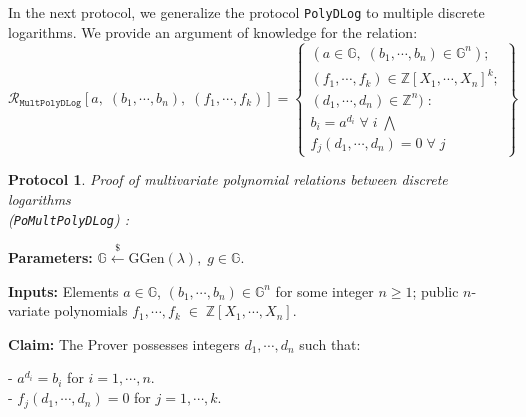 \documentclass[11pt, lettersize, notitlepage, leqno, footskip=0.6cm]{article}
\newcommand{\bz}{\mathbb Z}
\newcommand{\ttt}{\texttt}
\newcommand{\mc}{\mathcal}
\newcommand{\mb}{\mathbb}
\newcommand{\mr}{\mathrm}
\newcommand{\lamb}{\lambda}
\newtheorem{Prot}[Thm]{Protocol}
\numberwithin{equation}{section}
\begin{document}
In the next protocol, we generalize the protocol \verb|PolyDLog| to multiple discrete logarithms. We provide an argument of knowledge for the relation: 
\[
  \mc{R}_{\ttt{MultPolyDLog}}[a,\; (b_1,\cdots, b_n),\; (f_1,\cdots,f_k)] = \left\{\begin{array}{l}
    (a\in\mb{G},\; (b_1,\cdots, b_n)\in\mb{G}^n);\\
    (f_1,\cdots,f_k)\in\bz[X_1,\cdots,X_n]^k;\\ 
    (d_1,\cdots,d_n)\in\bz^n)\;: \\
    b_i = a^{d_i}\;\forall\; i\;\bigwedge \;\\   f_j(d_1,\cdots,d_n) = 0\;\forall\; j 
  \end{array}\right\}
\] 


\begin{Prot} \normalfont \hypertarget{Mult} {\textit{Proof of multivariate polynomial relations between discrete logarithms}}\\ (\verb|PoMultPolyDLog|) :\end{Prot} \vspace{-0.3cm}

\noindent \textbf{Parameters:} $\mb{G}\xleftarrow{\$} \mr{GGen}(\lamb), \; g\in \mb{G}$.

\noindent \textbf{Inputs:} Elements $a\in\mb{G} $, $(b_1,\cdots,b_n)\in \mb{G}^n$ for some integer $n\geq 1$; public $n$-variate polynomials $f_1,\cdots,f_k\;\in\; \bz[X_1,\cdots,X_n]$.

\noindent \textbf{Claim:} The Prover possesses integers $d_1,\cdots, d_n$ such that:

\noindent- $a^{d_i} = b_i$ for $i = 1,\cdots, n$.\\
- $f_j(d_1,\cdots,d_n) = 0$ for $j = 1,\cdots, k$.
\end{document}
